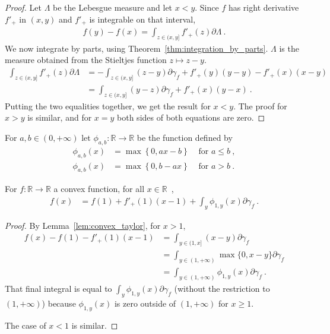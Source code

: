 \begin{proof}\leanok
{}
Let $\Lambda$ be the Lebesgue measure and let $x < y$. Since $f$ has right derivative $f'_+$ in $(x,y)$ and $f'_+$ is integrable on that interval,
\begin{align*}
f(y) - f(x) = \int_{z \in (x, y]} f'_+(z) \partial \Lambda
\: .
\end{align*}
We now integrate by parts, using Theorem~\ref{thm:integration_by_parts}. $\Lambda$ is the measure obtained from the Stieltjes function $z \mapsto z - y$.
\begin{align*}
\int_{z \in (x, y]} f'_+(z) \partial \Lambda
&= - \int_{z \in (x,y]} (z - y)\partial \gamma_f + f'_+(y)(y - y) - f'_+(x)(x - y)
\\
&= \int_{z \in (x,y]} (y - z)\partial \gamma_f + f'_+(x)(y - x)
\: .
\end{align*}
Putting the two equalities together, we get the result for $x < y$. The proof for $x > y$ is similar, and for $x = y$ both sides of both equations are zero.
\end{proof}


\begin{definition}
  \label{def:statInfoFun}
  \leanok
  \uses{}
  For $a,b \in (0, +\infty)$ let $\phi_{a,b} : \mathbb{R} \to \mathbb{R}$ be the function defined by
  \begin{align*}
  \phi_{a,b}(x) &= \max\left\{0, a x - b \right\} & \text{ for } a \le b \: ,
  \\
  \phi_{a,b}(x) &= \max\left\{0, b - a x \right\} & \text{ for } a > b \: .
  \end{align*}
\end{definition}


\begin{corollary}
  \label{cor:convex_taylor_statInfoFun}
  \leanok
  For $f: \mathbb{R} \to \mathbb{R}$ a convex function, for all $x \in \mathbb{R}$~,
  \begin{align*}
  f(x) &= f(1) + f'_+(1) (x - 1) + \int_{y} \phi_{1,y}(x) \partial\gamma_f \: .
  \end{align*}
\end{corollary}

\begin{proof}\leanok
{}
By Lemma~\ref{lem:convex_taylor}, for $x > 1$,
\begin{align*}
f(x) - f(1) - f'_+(1) (x - 1)
&= \int_{y \in (1, x]} (x - y) \partial\gamma_f
\\
&= \int_{y \in (1, +\infty)} \max\{0, x - y\} \partial\gamma_f
\\
&= \int_{y \in (1, +\infty)} \phi_{1,y}(x) \partial\gamma_f
\: .
\end{align*}
That final integral is equal to $\int_y \phi_{1,y}(x) \partial\gamma_f$ (without the restriction to $(1, +\infty)$) because $\phi_{1,y}(x)$ is zero outside of $(1, +\infty)$ for $x \ge 1$.

The case of $x < 1$ is similar.
\end{proof}


